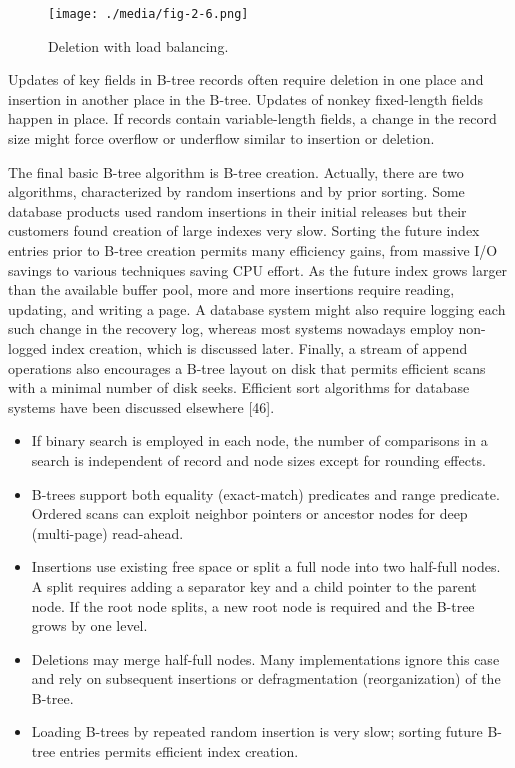 \begin{figure}
  \centering
  \texttt{[image: ./media/fig-2-6.png]}

  \caption{Deletion with load balancing.\label{fig-2-6}}
\end{figure}

Updates of key fields in B-tree records often require deletion in one
place and insertion in another place in the B-tree. Updates of nonkey
fixed-length fields happen in place. If records contain variable-length
fields, a change in the record size might force overflow or underflow
similar to insertion or deletion.

The final basic B-tree algorithm is B-tree creation. Actually, there are
two algorithms, characterized by random insertions and by prior sorting.
Some database products used random insertions in their initial releases
but their customers found creation of large indexes very slow. Sorting
the future index entries prior to B-tree creation permits many
efficiency gains, from massive I/O savings to various techniques saving
CPU effort. As the future index grows larger than the available buffer
pool, more and more insertions require reading, updating, and writing a
page. A database system might also require logging each such change in
the recovery log, whereas most systems nowadays employ non-logged index
creation, which is discussed later. Finally, a stream of append
operations also encourages a B-tree layout on disk that permits
efficient scans with a minimal number of disk seeks. Efficient sort
algorithms for database systems have been discussed elsewhere {[}46{]}.

\begin{itemize}
\item
  If binary search is employed in each node, the number of comparisons
  in a search is independent of record and node sizes except for
  rounding effects.
\end{itemize}

\begin{itemize}
\item
  B-trees support both equality (exact-match) predicates and range
  predicate. Ordered scans can exploit neighbor pointers or ancestor
  nodes for deep (multi-page) read-ahead.
\item
  Insertions use existing free space or split a full node into two
  half-full nodes. A split requires adding a separator key and a child
  pointer to the parent node. If the root node splits, a new root node
  is required and the B-tree grows by one level.
\item
  Deletions may merge half-full nodes. Many implementations ignore this
  case and rely on subsequent insertions or defragmentation
  (reorganization) of the B-tree.
\item
  Loading B-trees by repeated random insertion is very slow; sorting
  future B-tree entries permits efficient index creation.
\end{itemize}

